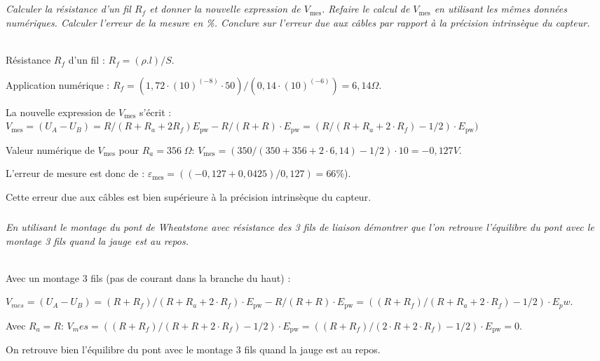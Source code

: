 \documentclass[10pt,fleqn]{article} %
\begin{document}
\begin{multicols}{2}
\subparagraph{}
\textit{Calculer la résistance d'un fil $R_f$ et donner la nouvelle expression de $V_{\text{mes}}$. Refaire le calcul de $V_{\text{mes}}$ en utilisant les mêmes données numériques. Calculer l'erreur de la mesure en \%. Conclure sur l'erreur due aux câbles par rapport à la précision intrinsèque du capteur.}


\ifprof
\begin{corrige}~\\

Résistance $R_f$ d’un fil : $R_f=(\rho.l)/S$.

Application numérique :	$R_f=(1,72\cdot(10)^(-8)\cdot50)/(0,14\cdot(10)^(-6) )= 6,14 \Omega$.

La nouvelle expression de $V_{\text{mes}}$ s’écrit : $V_{\text{mes}}=(U_A-U_B)=R/(R+R_a+2 R_f ) E_{\text{pw}}-R/(R+R) \cdot E_{\text{pw}}=(R/(R+ R_a+2\cdot R_f )- 1/2)\cdot E_{\text{pw}} )$

Valeur numérique de $V_{\text{mes}}$ pour $R_a=356 \; \Omega $: $V_{\text{mes}}=(350/(350+ 356+2\cdot 6,14)- 1/2)\cdot 10=-0,127 V$.

L’erreur de mesure est donc de :	$\varepsilon_{\text{mes}}=( (-0,127+0,0425)/0,127)=66 \%$).

Cette erreur due aux câbles est bien supérieure à la précision intrinsèque du capteur.

\end{corrige}
\else
\fi



\subparagraph{}
\textit{En utilisant le montage du pont de Wheatstone avec résistance des 3 fils de liaison démontrer que l'on retrouve l'équilibre du pont avec le montage 3 fils quand la jauge est au repos.}


\ifprof
\begin{corrige}~\\


Avec un montage 3 fils (pas de courant dans la branche du haut) :

$V_{mes}=(U_A-U_B)=(R+R_f)/(R+R_a+2\cdot R_f )\cdot E_{\text{pw}}-R/(R+R)\cdot E_{\text{pw}}=((R+R_f)/(R+ R_a+2\cdot R_f )- 1/2)\cdot E_pw$.

Avec $R_a= R$: $V_mes=((R+R_f)/(R+ R+2\cdot R_f )- 1/2)\cdot E_{\text{pw}}=((R+R_f)/(2\cdot  R+2\cdot R_f )- 1/2)\cdot E_{\text{pw}}=0$.

On retrouve bien l'équilibre du pont avec le montage 3 fils quand la jauge est au repos.



\end{corrige}
\else
\fi



\end{multicols}
\end{document}
